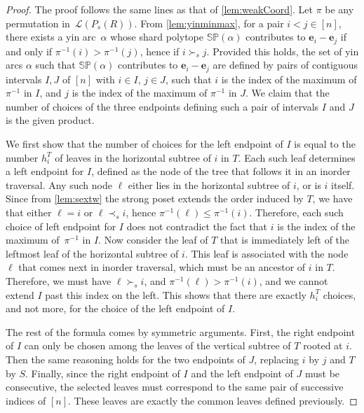 \documentclass{amsart}
\theoremstyle{definition}
\renewcommand{\b}[1]{{\boldsymbol{#1}}} %
\newcommand{\polytope}[1]{\mathds{#1}} %
\newcommand{\SP}{\polytope{SP}}
\begin{document}
\begin{proof}
  The proof follows the same lines as that of \cref{lem:weakCoord}.
  Let $\pi$ be any permutation in~$\mathcal{L}(P_s(R))$.
  From \cref{lem:yinminmax}, for a pair $i<j \in [n]$, there exists a yin arc~$\alpha$ whose shard polytope $\SP(\alpha)$ contributes to $\b{e}_i-\b{e}_j$ if and only if $\pi^{-1}(i)>\pi^{-1}(j)$, hence if $i\succ_s j$.
  Provided this holds, the set of yin arcs $\alpha$ such that $\SP(\alpha)$ contributes to $\b{e}_i-\b{e}_j$ are defined by pairs of contiguous intervals $I,J$ of $[n]$ with $i\in I$, $j\in J$, such that $i$ is the index of the maximum of $\pi^{-1}$ in $I$, and $j$ is the index of the maximum of $\pi^{-1}$ in $J$.
  We claim that the number of choices of the three endpoints defining such a pair of intervals $I$ and $J$ is the given product.

  We first show that the number of choices for the left endpoint of $I$ is equal to the number $h^T_i$ of leaves in the horizontal subtree of $i$ in $T$.
  Each such leaf determines a left endpoint for $I$, defined as the node of the tree that follows it in an inorder traversal.
  Any such node $\ell$ either lies in the horizontal subtree of $i$, or is $i$ itself.
  Since from \cref{lem:sextw} the strong poset extends the order induced by $T$, we have that either $\ell=i$ or $\ell\prec_s i$, hence $\pi^{-1}(\ell)\leq \pi^{-1}(i)$.
  Therefore, each such choice of left endpoint for $I$ does not contradict the fact that $i$ is the index of the maximum of~$\pi^{-1}$ in $I$.
  Now consider the leaf of $T$ that is immediately left of the leftmost leaf of the horizontal subtree of $i$.
  This leaf is associated with the node $\ell$ that comes next in inorder traversal, which must be an ancestor of $i$ in $T$.
  Therefore, we must have $\ell\succ_s i$, and $\pi^{-1}(\ell) > \pi^{-1}(i)$, and we cannot extend $I$ past this index on the left.
  This shows that there are exactly $h^T_i$ choices, and not more, for the choice of the left endpoint of $I$.

  The rest of the formula comes by symmetric arguments.
  First, the right endpoint of $I$ can only be chosen among the leaves of the vertical subtree of $T$ rooted at $i$.
  Then the same reasoning holds for the two endpoints of $J$, replacing $i$ by $j$ and $T$ by $S$.
  Finally, since the right endpoint of $I$ and the left endpoint of $J$ must be consecutive, the selected leaves must correspond to the same pair of successive indices of $[n]$.
  These leaves are exactly the common leaves defined previously.
\end{proof}
\end{document}
